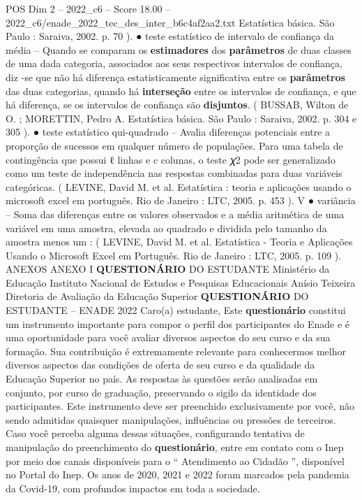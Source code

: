 \begin{textsample}{POS Dim 2 – 2022\_c6 – Score 18.00 – 2022\_c6/enade\_2022\_tec\_des\_inter\_b6c4af2aa2.txt}
Estatística básica.
São Paulo : Saraiva, 2002. p. 70 ). {\EmojiFont ●} teste estatístico de intervalo de confiança da média – Quando se comparam os \textbf{estimadores} dos \textbf{parâmetros} de duas classes de uma dada categoria, associados aos seus respectivos intervalos de confiança, diz -se que não há diferença estatisticamente significativa entre os \textbf{parâmetros} das duas categorias, quando há \textbf{interseção} entre os intervalos de confiança, e que há diferença, se os intervalos de confiança são \textbf{disjuntos}. ( BUSSAB, Wilton de O. ; MORETTIN, Pedro A.
Estatística básica.
São Paulo : Saraiva, 2002. p. 304 e 305 ). {\EmojiFont ●} teste estatístico qui-quadrado – Avalia diferenças potenciais entre a proporção de sucessos em qualquer número de populações.
Para uma tabela de contingência que possui ℓ linhas e c colunas, o teste 𝜒2 pode ser generalizado como um teste de independência nas respostas combinadas para duas variáveis categóricas. ( LEVINE, David M. et al.
Estatística : teoria e aplicações usando o microsoft excel em português.
Rio de Janeiro : LTC, 2005. p. 453 ).
V {\EmojiFont ●} variância – Soma das diferenças entre os valores observados e a média aritmética de uma variável em uma amostra, elevada ao quadrado e dividida pelo tamanho da amostra menos um : ( LEVINE, David M. et al.
Estatística - Teoria e Aplicações Usando o Microsoft Excel em Português.
Rio de Janeiro : LTC, 2005. p. 109 ).
ANEXOS ANEXO I \textbf{QUESTIONÁRIO} DO ESTUDANTE Ministério da Educação Instituto Nacional de Estudos e Pesquisas Educacionais Anísio Teixeira Diretoria de Avaliação da Educação Superior \textbf{QUESTIONÁRIO} DO ESTUDANTE – ENADE 2022 Caro(a) estudante, Este \textbf{questionário} constitui um instrumento importante para compor o perfil dos participantes do Enade e é uma oportunidade para você avaliar diversos aspectos do seu curso e da sua formação.
Sua contribuição é extremamente relevante para conhecermos melhor diversos aspectos das condições de oferta de seu curso e da qualidade da Educação Superior no país.
As respostas às questões serão analisadas em conjunto, por curso de graduação, preservando o sigilo da identidade dos participantes.
Este instrumento deve ser preenchido exclusivamente por você, não sendo admitidas quaisquer manipulações, influências ou pressões de terceiros.
Caso você perceba alguma dessas situações, configurando tentativa de manipulação do preenchimento do \textbf{questionário}, entre em contato com o Inep por meio dos canais disponíveis para o “ Atendimento ao Cidadão ”, disponível no Portal do Inep.
Os anos de 2020, 2021 e 2022 foram marcados pela pandemia da Covid-19, com profundos impactos em toda a sociedade.

\end{textsample}

